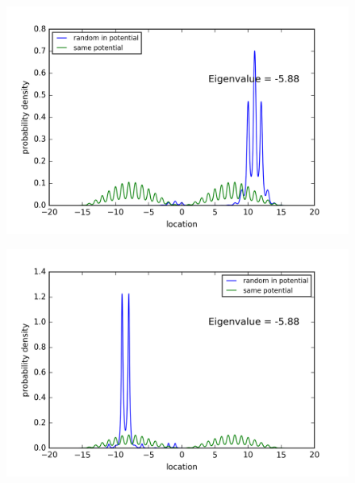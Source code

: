 \begin{figure}[!htbh]
\centering
\begin{minipage}{.45\textwidth}
  \centering
  \includegraphics[width=1.1\linewidth]{RandomPotential2/5_0a_2th_Lowest_Rand0_4_0_5.png}
  \label{fig:randPoa5_2th_0.5_0.4}
\end{minipage}\qquad
\begin{minipage}{.45\textwidth}
  \centering
  \includegraphics[width=1.1\linewidth]{RandomPotential2/5_0a_2th_Lowest_Rand0_2_0_5.png}
  \label{fig:randPoa5_2th_0.5_0.2}
\end{minipage}
\end{figure}

